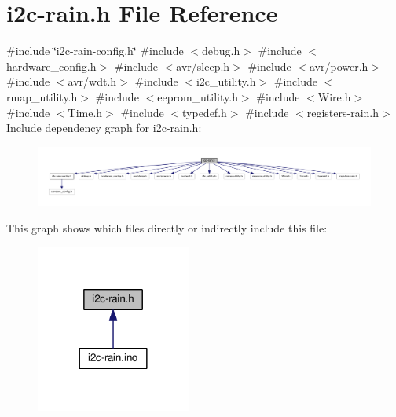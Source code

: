 \hypertarget{i2c-rain_8h}{}\section{i2c-\/rain.h File Reference}
\label{i2c-rain_8h}
{\ttfamily \#include \char`\"{}i2c-\/rain-\/config.\+h\char`\"{}}\newline
{\ttfamily \#include $<$debug.\+h$>$}\newline
{\ttfamily \#include $<$hardware\+\_\+config.\+h$>$}\newline
{\ttfamily \#include $<$avr/sleep.\+h$>$}\newline
{\ttfamily \#include $<$avr/power.\+h$>$}\newline
{\ttfamily \#include $<$avr/wdt.\+h$>$}\newline
{\ttfamily \#include $<$i2c\+\_\+utility.\+h$>$}\newline
{\ttfamily \#include $<$rmap\+\_\+utility.\+h$>$}\newline
{\ttfamily \#include $<$eeprom\+\_\+utility.\+h$>$}\newline
{\ttfamily \#include $<$Wire.\+h$>$}\newline
{\ttfamily \#include $<$Time.\+h$>$}\newline
{\ttfamily \#include $<$typedef.\+h$>$}\newline
{\ttfamily \#include $<$registers-\/rain.\+h$>$}\newline
Include dependency graph for i2c-\/rain.h\+:
\nopagebreak
\begin{figure}[H]
\begin{center}
\leavevmode
\includegraphics[width=350pt]{i2c-rain_8h__incl}
\end{center}
\end{figure}
This graph shows which files directly or indirectly include this file\+:
\nopagebreak
\begin{figure}[H]
\begin{center}
\leavevmode
\includegraphics[width=144pt]{i2c-rain_8h__dep__incl}
\end{center}
\end{figure}
